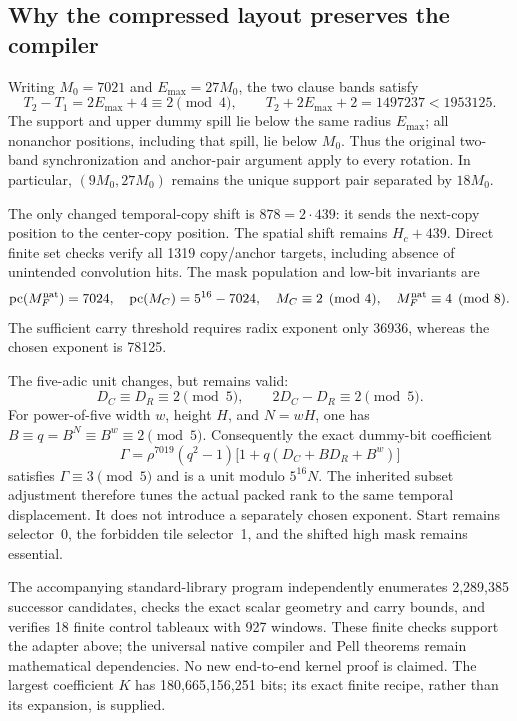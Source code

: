 \subsection{Why the compressed layout preserves the compiler}
Writing $M_0=7021$ and $E_{\max}=27M_0$, the two clause bands satisfy
\[
T_2-T_1=2E_{\max}+4\equiv2\pmod4,\qquad
T_2+2E_{\max}+2=1497237<1953125.
\]
The support and upper dummy spill lie below the same radius $E_{\max}$;
all nonanchor positions, including that spill, lie below $M_0$.
Thus the original two-band synchronization and anchor-pair argument apply
to every rotation.  In particular, $(9M_0,27M_0)$ remains the unique
support pair separated by $18M_0$.

The only changed temporal-copy shift is $878=2\cdot439$: it sends the
next-copy position to the center-copy position.  The spatial shift remains
$H_c+439$.  Direct finite set checks verify all 1319 copy/anchor targets,
including absence of unintended convolution hits.  The mask population
and low-bit invariants are
\[
\operatorname{pc}(M_F^{\rm nat})=7024,\quad
\operatorname{pc}(M_C)=5^{16}-7024,\quad
M_C\equiv2\pmod4,\quad M_F^{\rm nat}\equiv4\pmod8.
\]
The sufficient carry threshold requires radix exponent only 36936,
whereas the chosen exponent is 78125.

The five-adic unit changes, but remains valid:
\[
D_C\equiv D_R\equiv2\pmod5,\qquad 2D_C-D_R\equiv2\pmod5.
\]
For power-of-five width $w$, height $H$, and $N=wH$, one has
$B\equiv q=B^N\equiv B^w\equiv2\pmod5$.  Consequently the exact
dummy-bit coefficient
\[
\Gamma=\rho^{7019}(q^2-1)
       \bigl[1+q(D_C+BD_R+B^w)\bigr]
\]
satisfies $\Gamma\equiv3\pmod5$ and is a unit modulo $5^{16}N$.
The inherited subset adjustment therefore tunes the actual packed rank
to the same temporal displacement.  It does not introduce a separately
chosen exponent.  Start remains selector~0, the forbidden tile selector~1,
and the shifted high mask remains essential.

The accompanying standard-library program independently enumerates
2,289,385 successor candidates, checks the exact scalar geometry and
carry bounds, and verifies 18 finite control tableaux with 927 windows.
These finite checks support the adapter above; the universal native
compiler and Pell theorems remain mathematical dependencies.  No new
end-to-end kernel proof is claimed.  The largest coefficient $K$ has
180,665,156,251 bits; its exact finite recipe, rather than its expansion,
is supplied.
